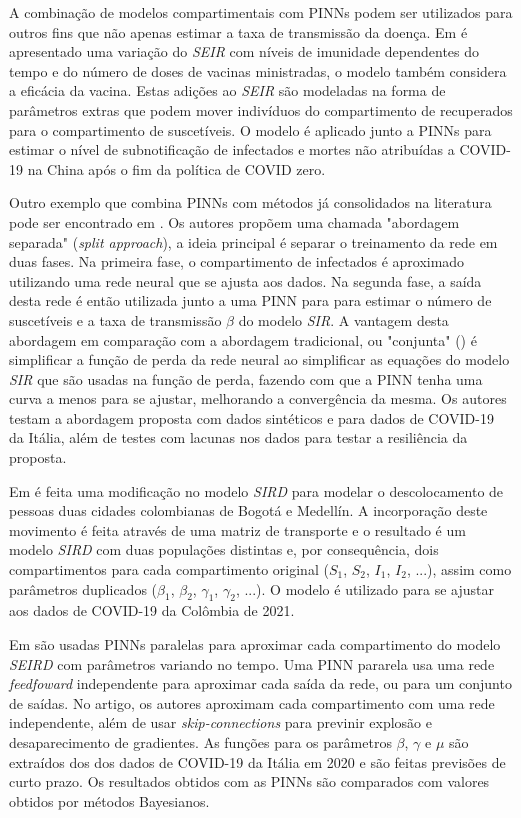 A combinação de modelos compartimentais com PINNs podem ser utilizados para 
outros fins que não apenas estimar a taxa de transmissão da doença.
Em \cite{ghosh-etal:23-subnotificacao} é apresentado uma variação do \textit{SEIR}
com níveis de imunidade dependentes do tempo e do número de doses de vacinas 
ministradas, o modelo também considera a eficácia da vacina. 
Estas adições ao \textit{SEIR} são modeladas na forma de parâmetros extras que 
podem mover indivíduos do compartimento de recuperados para o compartimento de
suscetíveis.
O modelo é aplicado junto a PINNs para estimar o nível de subnotificação de 
infectados e mortes não atribuídas a COVID-19 na China após o fim da política 
de COVID zero.

Outro exemplo que combina PINNs com métodos já consolidados na literatura
pode ser encontrado em \cite{millevoi-etal:24-split-join-pinns}.
Os autores propõem uma chamada "abordagem separada" (\textit{split approach}),
a ideia principal é separar o treinamento da rede em duas fases. Na primeira 
fase, o compartimento de infectados é aproximado utilizando uma rede neural
que se ajusta aos dados. Na segunda fase, a saída desta rede é então utilizada
junto a uma PINN para para estimar o número de suscetíveis e a taxa de transmissão
$\beta$ do modelo \textit{SIR}. A vantagem desta abordagem em comparação com a
abordagem tradicional, ou "conjunta" () é simplificar a 
função de perda da rede neural ao simplificar as equações do modelo \textit{SIR}
que são usadas na função de perda, fazendo com que a PINN tenha uma curva a menos 
para se ajustar, melhorando a convergência da mesma. Os autores
testam a abordagem proposta com dados sintéticos e para dados de COVID-19 da Itália,
além de testes com lacunas nos dados para testar a resiliência da proposta. 

Em \cite{ogueda-oliva:23-colombia-duas-cidades} é feita uma modificação no
modelo \textit{SIRD} para modelar o descolocamento de pessoas duas 
cidades colombianas de Bogotá e Medellín. A incorporação deste movimento 
é feita através de uma matriz de transporte e o resultado é um modelo \textit{SIRD}
com duas populações distintas e, por consequência, dois compartimentos para cada
compartimento original ($S_1$, $S_2$, $I_1$, $I_2$, ...), assim como parâmetros 
duplicados ($\beta_1$, $\beta_2$, $\gamma_1$, $\gamma_2$, ...). O modelo é utilizado
para se ajustar aos dados de COVID-19 da Colômbia de 2021.

Em \cite{ning-etal:23-pinns-paralelas} são usadas PINNs paralelas para aproximar
cada compartimento do modelo \textit{SEIRD} com parâmetros variando no tempo.
Uma PINN pararela usa uma rede \textit{feedfoward} independente para aproximar 
cada saída da rede, ou para um conjunto de saídas. 
No artigo, os autores aproximam cada compartimento com uma rede independente, 
além de usar \textit{skip-connections} para previnir explosão e desaparecimento
de gradientes. 
As funções para os parâmetros $\beta$, $\gamma$ e $\mu$ são extraídos dos dos 
dados de COVID-19 da Itália em 2020 e são feitas previsões de curto prazo.
Os resultados obtidos com as PINNs são comparados com valores obtidos por métodos
Bayesianos. 

